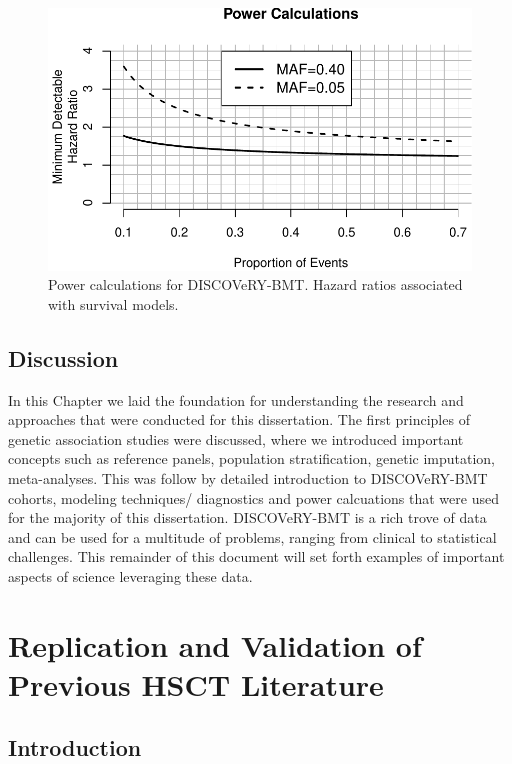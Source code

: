 \documentclass[]{DissertateOSU}
\begin{document}
\begin{figure}
\centering
\includegraphics{figures/unnamed-chunk-20-1.pdf}
\caption{Power calculations for DISCOVeRY-BMT. Hazard ratios associated
with survival models.}
\end{figure}

\section{Discussion}\label{discussion}

In this Chapter we laid the foundation for understanding the research
and approaches that were conducted for this dissertation. The first
principles of genetic association studies were discussed, where we
introduced important concepts such as reference panels, population
stratification, genetic imputation, meta-analyses. This was follow by
detailed introduction to DISCOVeRY-BMT cohorts, modeling techniques/
diagnostics and power calcuations that were used for the majority of
this dissertation. DISCOVeRY-BMT is a rich trove of data and can be used
for a multitude of problems, ranging from clinical to statistical
challenges. This remainder of this document will set forth examples of
important aspects of science leveraging these data.

\FloatBarrier

\newpage

\pagestyle{plain} \fancyhead[L]{} \fancyhead[R]{}
\fancyfoot[C]{\thepage}
\chapter{Replication and Validation of Previous HSCT Literature}
\doublespacing

\section{Introduction}\label{introduction-1}
\end{document}
